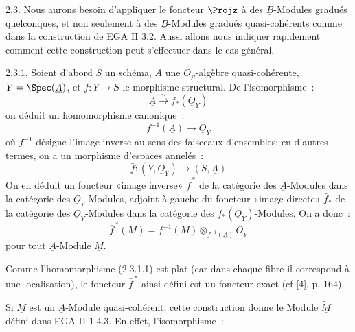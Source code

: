
2.3.
Nous aurons besoin d'appliquer le foncteur \(\Projz\) à des \(\underline{B}\)-Modules gradués quelconques, et non seulement à des \(\underline{B}\)-Modules gradués quasi-cohérents comme dans la construction de EGA II 3.2. Aussi allons nous indiquer rapidement comment cette construction peut s'effectuer dans le cas général.

2.3.1. Soient d'abord \(S\) un schéma, \(\underline{A}\) une \(\underline{O}_S\)-algèbre quasi-cohérente, \(Y=\Spec(\underline{A})\), et \(f:Y\to S\) le morphisme structural. De l'isomorphisme~:
\[
  \underline{A}\xrightarrow{\sim} f_*(\underline{O}_Y)
\]
on déduit un homomorphisme canonique~:
\begin{equation}\tag{2.3.1.1}
  f^{-1}(\underline{A})\longrightarrow \underline{O}_Y
\end{equation}
où \(f^{-1}\) désigne l'image inverse au sens des faisceaux d'ensembles; en d'autres termes, on a un morphisme d'espaces annelés~:
\begin{equation}\tag{2.3.1.2}
  \bar f:(Y,\underline{O}_Y)\longrightarrow (S,\underline{A})
\end{equation}
On en déduit un foncteur «image inverse» \(\bar f^{\,*}\) de la catégorie des \(\underline{A}\)-Modules dans la catégorie des \(\underline{O}_Y\)-Modules, adjoint à gauche du foncteur «image directe» \(\bar f_*\) de la catégorie des \(\underline{O}_Y\)-Modules dans la catégorie des \(f_*(\underline{O}_Y)\)-Modules. On a donc~:
\begin{equation}\tag{2.3.1.3}
  \bar f^{\,*}(\underline{M})=f^{-1}(\underline{M})\otimes_{f^{-1}(\underline{A})}\underline{O}_Y
\end{equation}
pour tout \(\underline{A}\)-Module \(\underline{M}\).

Comme l'homomorphisme (2.3.1.1) est plat (car dans chaque fibre il correspond à une localisation), le foncteur \(\bar f^{\,*}\) ainsi défini est un foncteur exact (cf [4], p. 164).

Si \(\underline{M}\) est un \(\underline{A}\)-Module quasi-cohérent, cette construction donne le Module \(\widetilde{\underline{M}}\) défini dans EGA II 1.4.3. En effet, l'isomorphisme~:
